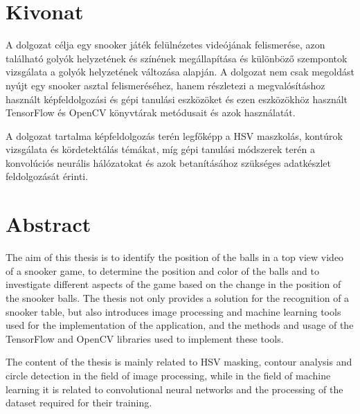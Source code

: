 \setcounter{page}{1}

\selecthungarian

\chapter*{Kivonat}%

A dolgozat célja egy snooker játék felülnézetes videójának felismerése, azon található golyók helyzetének és színének megállapítása és különböző szempontok vizsgálata a golyók helyzetének változása alapján. A dolgozat nem csak megoldást nyújt egy snooker asztal felismeréséhez, hanem részletezi a megvalósításhoz használt képfeldolgozási és gépi tanulási eszközöket és ezen eszközökhöz használt TensorFlow és OpenCV könyvtárak metódusait és azok használatát.
\par A dolgozat tartalma képfeldolgozás terén legfőképp a HSV maszkolás, kontúrok vizsgálata és kördetektálás témákat, míg gépi tanulási módszerek terén a konvolúciós neurális hálózatokat és azok betanításához szükséges adatkészlet feldolgozását érinti.


\vfill
\selectenglish


\chapter*{Abstract}%

The aim of this thesis is to identify the position of the balls in a top view video of a snooker game, to determine the position and color of the balls and to investigate different aspects of the game based on the change in the position of the snooker balls. The thesis not only provides a solution for the recognition of a snooker table, but also introduces image processing and machine learning tools used for the implementation of the application, and the methods and usage of the TensorFlow and OpenCV libraries used to implement these tools.
\par The content of the thesis is mainly related to HSV masking, contour analysis and circle detection in the field of image processing, while in the field of machine learning it is related to convolutional neural networks and the processing of the dataset required for their training.

\vfill
\selectthesislanguage

\setcounter{romanPage}{\value{page}}
